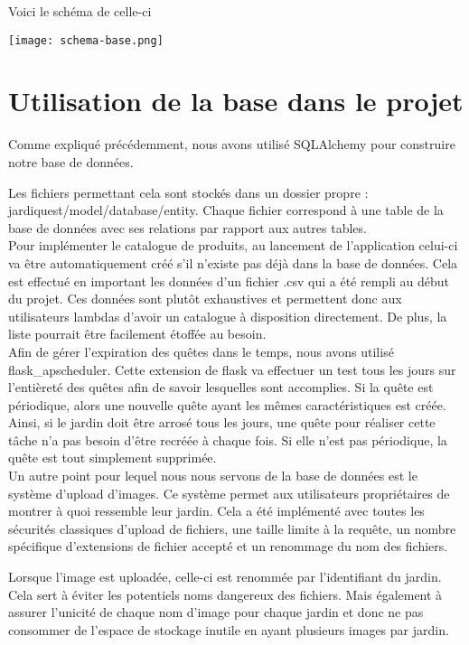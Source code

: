 \documentclass[12pt,titlepage]{report}
\begin{document}
Voici le schéma de celle-ci
\begin{center}
     \texttt{[image: schema-base.png]} 
\end{center}

\section{Utilisation de la base dans le projet}


Comme expliqué précédemment, nous avons utilisé SQLAlchemy pour construire notre base de données.

Les fichiers permettant cela sont stockés dans un dossier propre : jardiquest/model/database/entity. Chaque fichier correspond à une table de la base de données avec ses relations par rapport aux autres tables. \\

Pour implémenter le catalogue de produits, au lancement de l’application celui-ci va être automatiquement créé s’il n’existe pas déjà dans la base de données. Cela est effectué en important les données d’un fichier .csv qui a été rempli au début du projet. Ces données sont plutôt exhaustives et permettent donc aux utilisateurs lambdas d’avoir un catalogue à disposition directement. De plus, la liste pourrait être facilement étoffée au besoin. \\


Afin de gérer l’expiration des quêtes dans le temps, nous avons utilisé flask\_apscheduler. Cette extension de flask va effectuer un test tous les jours sur l'entièreté des quêtes afin de savoir lesquelles sont accomplies. Si la quête est périodique, alors une nouvelle quête ayant les mêmes caractéristiques est créée. Ainsi, si le jardin doit être arrosé tous les jours, une quête pour réaliser cette tâche n'a pas besoin d'être recréée à chaque fois. Si elle n'est pas périodique, la quête est tout simplement supprimée. \\

Un autre point pour lequel nous nous servons de la base de données est le système d’upload d'images. Ce système permet aux utilisateurs propriétaires de montrer à quoi ressemble leur jardin. Cela a été implémenté avec toutes les sécurités classiques d’upload de fichiers, une taille limite à la requête, un nombre spécifique d’extensions de fichier accepté et un renommage du nom des fichiers.

Lorsque l'image est uploadée, celle-ci est renommée par l’identifiant du jardin. Cela sert à éviter les potentiels noms dangereux des fichiers. Mais également à assurer l'unicité de chaque nom d’image pour chaque jardin et donc ne pas consommer de l’espace de stockage inutile en ayant plusieurs images par jardin.
\end{document}
